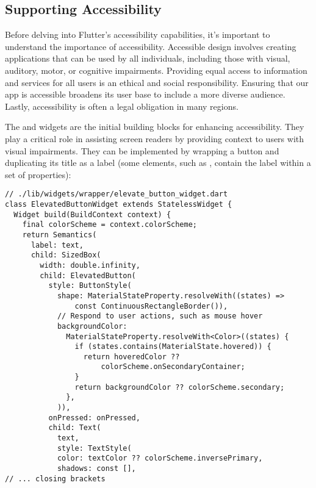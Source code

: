 
\subsection{Supporting Accessibility}

Before delving into Flutter's accessibility capabilities, it's important to understand the importance of accessibility. 
Accessible design involves creating applications that can be used by all individuals, including those with visual, 
auditory, motor, or cognitive impairments. Providing equal access to information and services for all users is an 
ethical and social responsibility. Ensuring that our app is accessible  broadens its user base to include a 
more diverse audience. Lastly, accessibility is often a legal obligation in many regions.

The  and  widgets are the initial building blocks for enhancing accessibility. They play a 
critical role in assisting screen readers by providing context to users with visual impairments. They can be implemented 
by wrapping a button and duplicating its title as a label (some elements, such as , contain the 
label within a set of properties):

\begin{lstlisting}
// ./lib/widgets/wrapper/elevate_button_widget.dart
class ElevatedButtonWidget extends StatelessWidget {
  Widget build(BuildContext context) {
    final colorScheme = context.colorScheme;
    return Semantics(
      label: text,
      child: SizedBox(
        width: double.infinity,
        child: ElevatedButton(
          style: ButtonStyle(
            shape: MaterialStateProperty.resolveWith((states) => 
                const ContinuousRectangleBorder()),
            // Respond to user actions, such as mouse hover
            backgroundColor: 
              MaterialStateProperty.resolveWith<Color>((states) {
                if (states.contains(MaterialState.hovered)) {
                  return hoveredColor ?? 
                      colorScheme.onSecondaryContainer;
                }
                return backgroundColor ?? colorScheme.secondary;
              },
            )),
          onPressed: onPressed,
          child: Text(
            text,
            style: TextStyle(
            color: textColor ?? colorScheme.inversePrimary,
            shadows: const [],
// ... closing brackets
\end{lstlisting}

